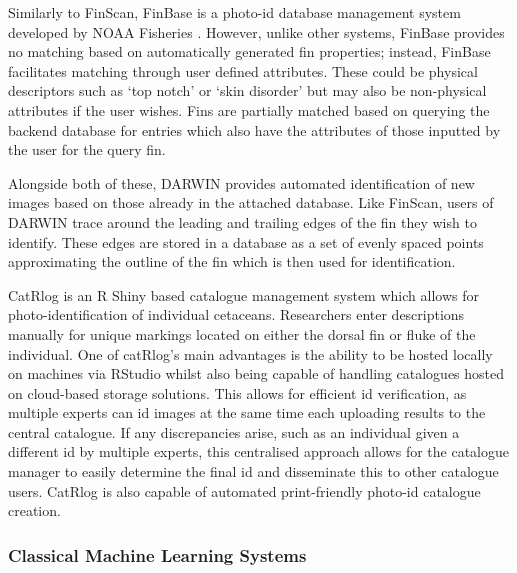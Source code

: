 Similarly to FinScan, FinBase is a photo-id database management system developed by NOAA Fisheries \cite{adams_automating_2006}. However, unlike other systems, FinBase provides no matching based on automatically generated fin properties; instead, FinBase facilitates matching through user defined attributes. These could be physical descriptors such as `top notch' or `skin disorder' but may also be non-physical attributes if the user wishes. Fins are partially matched based on querying the backend database for entries which also have the attributes of those inputted by the user for the query fin. 

Alongside both of these, DARWIN \cite{hale_unsupervised_2012} provides automated identification of new images based on those already in the attached database. Like FinScan, users of DARWIN trace around the leading and trailing edges of the fin they wish to identify. These edges are stored in a database as a set of evenly spaced points approximating the outline of the fin which is then used for identification.

CatRlog \cite{keen_catrlog_2021} is an R Shiny based catalogue management system which allows for photo-identification of individual cetaceans. Researchers enter descriptions manually for unique markings located on either the dorsal fin or fluke of the individual. One of catRlog's main advantages is the ability to be hosted locally on machines via RStudio whilst also being capable of handling catalogues hosted on cloud-based storage solutions. This allows for efficient id verification, as multiple experts can id images at the same time each uploading results to the central catalogue. If any discrepancies arise, such as an individual given a different id by multiple experts, this centralised approach allows for the catalogue manager to easily determine the final id and disseminate this to other catalogue users. CatRlog is also capable of automated print-friendly photo-id catalogue creation. 

\subsubsection{Classical Machine Learning Systems}\label{ch:Background,sec:conTech,sub:photoIDAides,subsub:nonDL}

